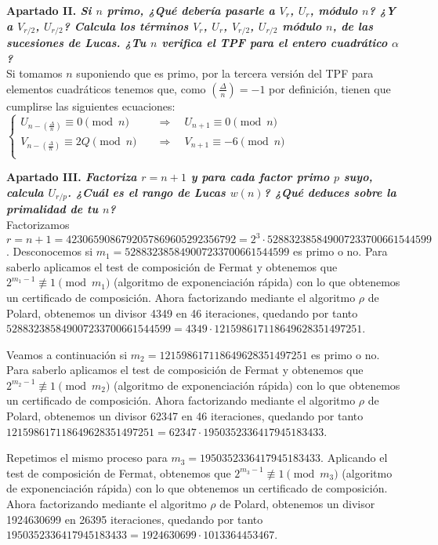 \documentclass[fleqn]{article}
\def\next{\quad \Rightarrow \quad}
\begin{document}
    \newpage
    \textbf{Apartado II. \textit{Si $n$ primo, ¿Qué debería pasarle a $V_r$, $U_r$, módulo $n$? ¿Y a $V_{r/2}$, $U_{r/2}$?
            Calcula los términos $V_r$, $U_r$, $V_{r/2}$, $U_{r/2}$ módulo $n$, de las sucesiones de Lucas.
            ¿Tu $n$ verifica el TPF para el entero cuadrático $\alpha$?}}\\
    Si tomamos $n$ suponiendo que es primo, por la tercera versión del TPF para elementos cuadráticos tenemos que, como 
    $\left(\frac{\Delta}{n}\right) = -1$ por definición, tienen que cumplirse las siguientes ecuaciones:\\ 
    $\left\{
    \begin{aligned}
        U_{n-\left(\frac{\Delta}{n}\right)} \equiv 0 \pmod{n} &\next U_{n+1} \equiv 0 \pmod{n} \\
        V_{n-\left(\frac{\Delta}{n}\right)} \equiv 2Q \pmod{n} &\next V_{n+1} \equiv -6 \pmod{n} \\
    \end{aligned}
    \right.$


    
    \newpage
    \textbf{Apartado III. \textit{Factoriza $r = n+1$ y para cada factor primo $p$ suyo, calcula $U_{r/p}$.
            ¿Cuál es el rango de Lucas $w(n)$? ¿Qué deduces sobre la primalidad de tu $n$?}} \\
    Factorizamos $r = n+1 = 4230659086792057869605292356792 = 2^3 \cdot 528832385849007233700661544599$. Desconocemos si
    $m_1 = 528832385849007233700661544599$ es primo o no. Para saberlo aplicamos el test de composición de Fermat y obtenemos que 
    $2^{m_1 -1} \not\equiv 1 \pmod{m_1}$ (algoritmo de exponenciación rápida) con lo que obtenemos un certificado de composición. Ahora factorizando mediante el algoritmo $\rho$
    de Polard, obtenemos un divisor 4349 en 46 iteraciones, quedando por tanto $528832385849007233700661544599 = 4349 \cdot 121598617118649628351497251$.

    Veamos a continuación si $m_2 = 121598617118649628351497251$ es primo o no. Para saberlo aplicamos el test de composición de Fermat y
    obtenemos que $2^{m_2 -1} \not\equiv 1 \pmod{m_2}$ (algoritmo de exponenciación rápida) con lo que obtenemos un certificado de composición. 
    Ahora factorizando mediante el algoritmo $\rho$ de Polard, obtenemos un divisor 62347 en 46 iteraciones, quedando por tanto $121598617118649628351497251 = 62347 \cdot 1950352336417945183433$.
    
    Repetimos el mismo proceso para $m_3 = 1950352336417945183433$. Aplicando el test de composición de Fermat, obtenemos que 
    $2^{m_3 -1} \not\equiv 1 \pmod{m_3}$ (algoritmo de exponenciación rápida) con lo que obtenemos un certificado de composición.
    Ahora factorizando mediante el algoritmo $\rho$ de Polard, obtenemos un divisor 1924630699 en 26395 iteraciones, quedando por tanto 
    $1950352336417945183433 = 1924630699 \cdot 1013364453467$.
    
\end{document}
